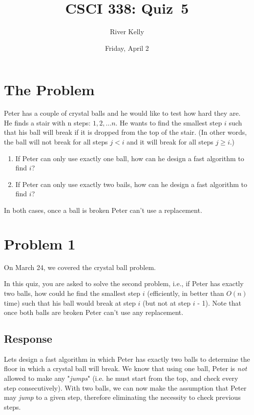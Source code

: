 \documentclass[11pt]{article}
\title{CSCI 338: Quiz~5}
\author{River Kelly}
\date{Friday, April 2}
\begin{document}
\maketitle

\section*{The Problem}

\noindent
Peter has a couple of crystal balls and he would like to test how hard they are.
He finds a stair with n steps: $1,2,\ldots n$.
He wants to find the smallest step $i$ such that his ball will break if it is dropped from the top
of the stair.
(In other words, the ball will not break for all steps $j < i$ and it will break for all steps $j \geq i$.)

\begin{enumerate}
    \item If Peter can only use exactly one ball, how can he design a fast algorithm to find $i$?
    \item If Peter can only use exactly two bails, how can he design a fast algorithm to find $i$?
\end{enumerate}

\noindent
In both cases, once a ball is broken Peter can't use a replacement.

\newpage
\section*{Problem 1}
On March 24, we covered the crystal ball problem.

\noindent
In this quiz, you are asked to solve the second problem, i.e., if Peter has exactly two balls, how could he find the smallest step $i$ (efficiently, in better than $O(n)$ time) such that his ball would break at step $i$ (but not at step $i$ - 1).
Note that once both balls are broken Peter can't use any replacement.

\subsection*{Response}

Lets design a fast algorithm in which Peter has exactly two balls to determine the floor in which a crystal ball will break. We know that using one ball, Peter is \textit{not} allowed to make any "\textit{jumps}" (i.e. he must start from the top, and check every step consecutively). With two balls, we can now make the assumption that Peter may \textit{jump} to a given step, therefore eliminating the necessity to check previous steps.
\end{document}
